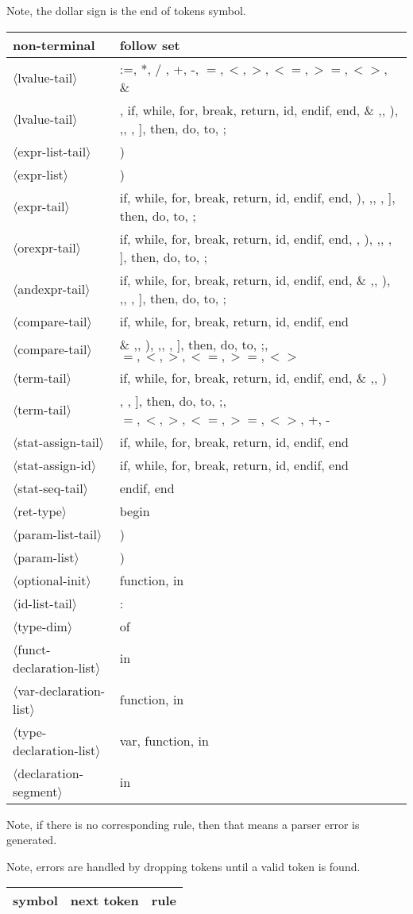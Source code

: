 \documentclass[11pt, fleqn]{article}
\newcommand{\atag}[1]{$\langle$#1$\rangle$}
\begin{document}
Note, the dollar sign is the end of tokens symbol.

\begin{longtable}{l|l}
non-terminal						&	follow set												\\
\hline
\atag{lvalue-tail}				&	:=, *, /	, +, -, $=, <, >, <=, >=, <>$, \& \\
\atag{lvalue-tail}				&	\textbar , if, while, for, break, return, id, endif, end,  \& ,\textbar , ), ,, , ], then, do, to, ; 					\\
\atag{expr-list-tail}			&	)												\\
\atag{expr-list}					&	)								\\
\atag{expr-tail}					&	if, while, for, break, return, id, endif, end, ), ,, , ], then, do, to, ;	\\
\atag{orexpr-tail}				&	if, while, for, break, return, id, endif, end, \textbar , ), ,, , ], then, do, to, ;	\\
\atag{andexpr-tail}				&	if, while, for, break, return, id, endif, end, \& ,\textbar , ), ,, , ], then, do, to, ; 	\\
\atag{compare-tail}				&	if, while, for, break, return, id, endif, end	\\
\atag{compare-tail}				&	\& ,\textbar , ), ,, , ], then, do, to, ;, $=, <, >, <=, >=, <>$	\\
\atag{term-tail}					&	if, while, for, break, return, id, endif, end, \& ,\textbar , )	\\
\atag{term-tail}					&	, , ], then, do, to, ;, $=, <, >, <=, >=, <>$, +, -	\\
\atag{stat-assign-tail}			&	if, while, for, break, return, id, endif, end	\\
\atag{stat-assign-id}			&	if, while, for, break, return, id, endif, end	\\
\atag{stat-seq-tail}				&	endif, end		\\
\atag{ret-type}					&	begin		\\
\atag{param-list-tail}			&	)	\\
\atag{param-list}				&	)		\\
\atag{optional-init}				&	function, in		\\
\atag{id-list-tail}				&	:		\\
\atag{type-dim}					&	of	\\
\atag{funct-declaration-list}	&	in	\\
\atag{var-declaration-list}		&	function, in	\\
\atag{type-declaration-list}		&	var, function, in		\\
\atag{declaration-segment}		&	in	\\
\end{longtable}


Note, if there is no corresponding rule, then that means a parser error is generated.

Note, errors are handled by dropping tokens until a valid token is found.

\begin{longtable}{l|l|l}
symbol		&	next token	&	rule												\\
\hline

\end{longtable}
\end{document}
